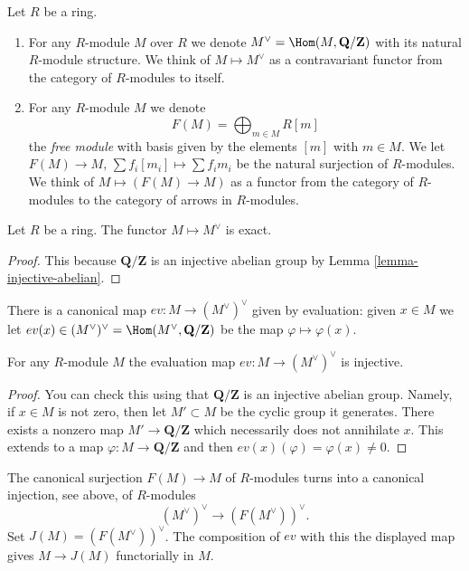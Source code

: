 \begin{definition}
\label{definition-simple-functors}
Let $R$ be a ring.
\begin{enumerate}
\item For any $R$-module $M$ over $R$ we denote
$M^\vee = \Hom(M, \mathbf{Q}/\mathbf{Z})$
with its natural $R$-module structure. We think
of {\it $M \mapsto M^\vee$} as a contravariant functor
from the category of $R$-modules to itself.
\item For any $R$-module $M$ we denote
$$
F(M) = \bigoplus\nolimits_{m \in M} R[m]
$$
the {\it free module} with basis given by the elements $[m]$ with
$m \in M$. We let $F(M)\to M$, $\sum f_i [m_i] \mapsto \sum f_i m_i$
be the natural surjection of $R$-modules.
We think of $M \mapsto (F(M) \to M)$ as a functor from
the category of $R$-modules to the category of
arrows in $R$-modules.
\end{enumerate}
\end{definition}

\begin{lemma}
\label{lemma-vee-exact}
Let $R$ be a ring.
The functor $M \mapsto M^\vee$ is exact.
\end{lemma}

\begin{proof}
This because $\mathbf{Q}/\mathbf{Z}$
is an injective abelian group by Lemma \ref{lemma-injective-abelian}.
\end{proof}

\noindent
There is a canonical map $ev : M \to (M^\vee)^\vee$
given by evaluation: given $x \in M$ we let
$ev(x) \in (M^\vee)^\vee = \Hom(M^\vee, \mathbf{Q}/\mathbf{Z})$
be the map $\varphi \mapsto \varphi(x)$.

\begin{lemma}
\label{lemma-ev-injective}
For any $R$-module $M$ the evaluation map
$ev : M \to (M^\vee)^\vee$ is injective.
\end{lemma}

\begin{proof}
You can check this using that $\mathbf{Q}/\mathbf{Z}$ is an injective
abelian group. Namely, if $x \in M$ is not zero, then let
$M' \subset M$ be the cyclic group it generates. There exists
a nonzero map $M' \to \mathbf{Q}/\mathbf{Z}$ which necessarily does
not annihilate $x$. This extends to
a map $\varphi : M \to \mathbf{Q}/\mathbf{Z}$
and then $ev(x)(\varphi) = \varphi(x) \not = 0$.
\end{proof}

\noindent
The canonical surjection $F(M) \to M$ of $R$-modules turns into
a canonical injection, see above, of $R$-modules
$$
(M^\vee)^\vee \longrightarrow (F(M^\vee))^\vee.
$$
Set $J(M) = (F(M^\vee))^\vee$. The composition of $ev$ with this
the displayed map gives $M \to J(M)$ functorially in $M$.

